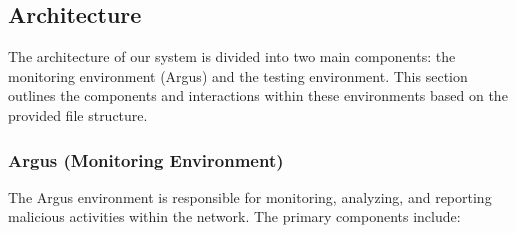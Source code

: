 \documentclass{article}
\begin{document}
    \subsection{Architecture}\label{subsec:architecture}

    The architecture of our system is divided into two main components: the monitoring environment (Argus) and the testing environment.
    This section outlines the components and interactions within these environments based on the provided file structure.

    \subsubsection{Argus (Monitoring Environment)}\label{subsubsec:argus-environment}

    The Argus environment is responsible for monitoring, analyzing, and reporting malicious activities within the network.
    The primary components include:
\end{document}
